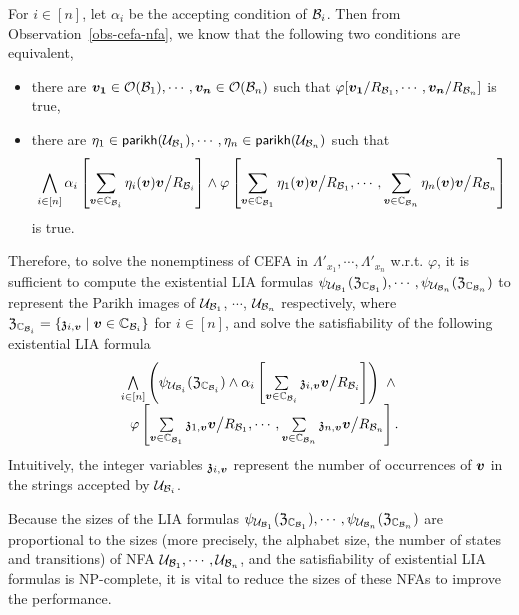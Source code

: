 For $i \in [n]$, let $\alpha_i$ be the accepting condition of $\mathcal{B}_i$. 
Then from Observation~\ref{obs-cefa-nfa}, we know that the following two conditions are equivalent, 
\begin{itemize}

\item there are $\myvec{v_{1}} \in \cefaout(\cB_1), \cdots, \myvec{v_{n}} \in \cefaout(\cB_n)$ such that $\varphi[\myvec{v_{1}}/R_{\cB_{1}}, \cdots, \myvec{v_{n}}/R_{\cB_{n}}]$ is true, 
\item 
there are $\eta_1 \in \mathsf{parikh}(\mathcal{U}_{\mathcal{B}_1}), \cdots, \eta_n \in \mathsf{parikh}(\mathcal{U}_{\mathcal{B}_n})$ such that 
\[
\bigwedge \limits_{i \in [n]} \alpha_i\left[ \sum \limits_{\myvec{v} \in \costset_{\cB_i}} \eta_i(\myvec{v}) \myvec{v} \big{/}R_{\cB_i}  \right] \wedge \varphi \left[\sum \limits_{\myvec{v} \in \costset_{\cB_1}} \eta_1(\myvec{v}) \myvec{v} \big{/}R_{\cB_1}, \cdots, \sum \limits_{\myvec{v} \in \costset_{\cB_n}} \eta_n(\myvec{v}) \myvec{v} \big{/}R_{\cB_n} \right]
\]
is true. 
\end{itemize}

Therefore, to solve the nonemptiness of CEFA in $\Lambda'_{x_1}, \cdots, \Lambda'_{x_n}$ w.r.t. $\varphi$, it is sufficient to compute the existential LIA formulas $\psi_{\mathcal{U}_{\mathcal{B}_1}}(\mathfrak{Z}_{\mathbb{C}_{\mathcal{B}_1}}), \cdots, \psi_{\mathcal{U}_{\mathcal{B}_n}}(\mathfrak{Z}_{\mathbb{C}_{\mathcal{B}_n}})$ to represent the Parikh images of $\mathcal{U}_{\mathcal{B}_1}$, $\cdots$, $\mathcal{U}_{\mathcal{B}_n}$ respectively, where $\fZ_{\costset_{\cB_i}} = \{\anivarz_{i,\myvec{v}} \mid \myvec{v} \in \costset_{\cB_i}\}$ for $i \in [n]$, and solve the satisfiability of the following existential LIA formula
\[
\begin{array}{l}
\bigwedge \limits_{i \in [n]} \left(\psi_{\cU_{\cB_i}}(\fZ_{\costset_{\cB_i}}) \wedge \alpha_i\left[\sum\limits_{\myvec{v} \in \costset_{\cB_i}} \anivarz_{i, \myvec{v}} \myvec{v} \big{/}R_{\cB_i}  \right] \right)\  \wedge \\
\ \ \varphi \left[ \sum\limits_{\myvec{v} \in \costset_{\cB_1}} \anivarz_{1, \myvec{v}} \myvec{v} \big{/}R_{\cB_1}, \cdots, \sum\limits_{\myvec{v} \in \costset_{\cB_n}} \anivarz_{n, \myvec{v}} \myvec{v} \big{/}R_{\cB_n} \right].
\end{array}
\]
Intuitively, the integer variables $\anivarz_{i, \myvec{v}}$ represent the number of occurrences of $\myvec{v}$ in the strings accepted by $\mathcal{U}_{\mathcal{B}_i}$.

Because the sizes of the LIA formulas $\psi_{\mathcal{U}_{\mathcal{B}_1}}(\mathfrak{Z}_{\mathbb{C}_{\mathcal{B}_1}}), \cdots, \psi_{\mathcal{U}_{\mathcal{B}_n}}(\mathfrak{Z}_{\mathbb{C}_{\mathcal{B}_n}})$ are proportional to the sizes (more precisely, the alphabet size, the number of states and transitions) of NFA $\mathcal{U}_{\mathcal{B}_1}, \cdots, \mathcal{U}_{\mathcal{B}_n}$, and the satisfiability of existential LIA formulas is NP-complete, it is vital to reduce the sizes of these NFAs to improve the performance.

